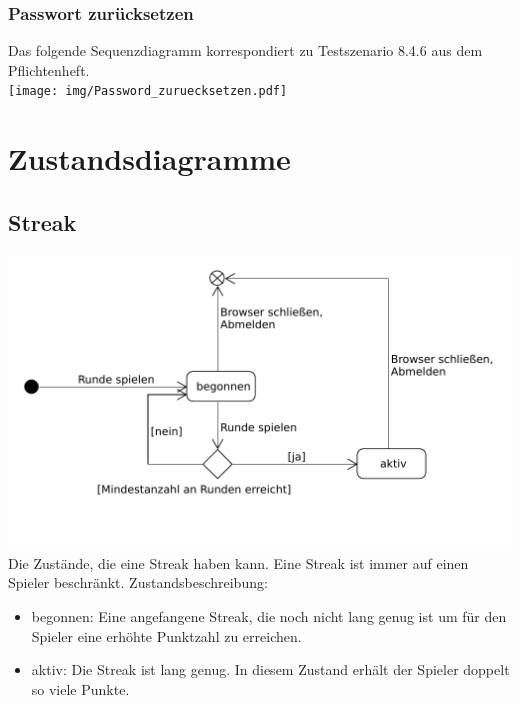 \documentclass[a4paper]{scrreprt}
\begin{document}
	\subsection{Passwort zurücksetzen}
	Das folgende Sequenzdiagramm korrespondiert zu Testszenario 8.4.6 aus dem Pflichtenheft. \\
	\texttt{[image: img/Password\_zuruecksetzen.pdf]}






	\chapter{Zustandsdiagramme}
	\section{Streak}
	\hypertarget{StreakState}{}
	\label{fig:Streak_State}
	\includegraphics[width=\textwidth]{img/Streak_Zustand.pdf}
	Die Zustände, die eine Streak haben kann.
	Eine Streak ist immer auf einen Spieler beschränkt.
	Zustandsbeschreibung:
	\begin{itemize}
		\item begonnen: Eine angefangene Streak, die noch nicht lang genug ist um für den Spieler eine erhöhte Punktzahl zu erreichen.
		\item aktiv: Die Streak ist lang genug. In diesem Zustand erhält der Spieler doppelt so viele Punkte.
	\end{itemize}
\end{document}
